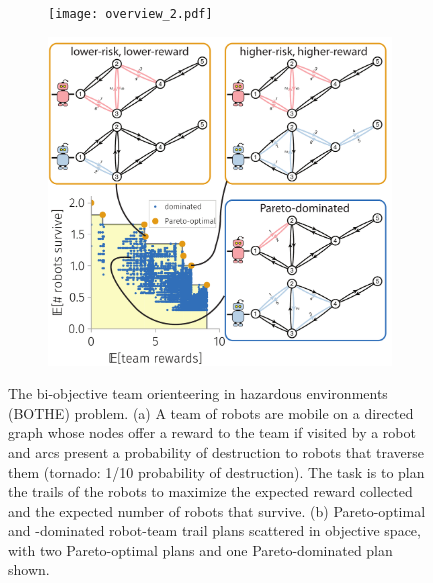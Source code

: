 \documentclass[11pt, oneside]{article}
\begin{document}
\begin{figure}[h!]
    \centering
     \begin{subfigure}[b]{0.62\textwidth}
    	\texttt{[image: overview\_2.pdf]}
	\caption{} \label{fig:overview}
    \end{subfigure}
    \begin{subfigure}[b]{0.66\textwidth}
    	\includegraphics[width=\textwidth]{toy_pareto_front2.pdf}
	\caption{} \label{fig:pareto_optimal}
    \end{subfigure}
    \caption{
      The bi-objective team orienteering in hazardous environments (BOTHE) problem.
      (a) A team of robots are mobile on a directed graph whose 
      nodes offer a reward to the team if visited by a robot and 
      arcs present a probability of destruction to robots that traverse them (tornado: 1/10 probability of destruction). The task is to plan the trails of the robots to maximize the expected reward collected and the expected number of robots that survive.
      (b) Pareto-optimal and -dominated robot-team trail plans scattered in objective space, with two Pareto-optimal plans and one Pareto-dominated plan shown.}
\end{figure}
\end{document}

